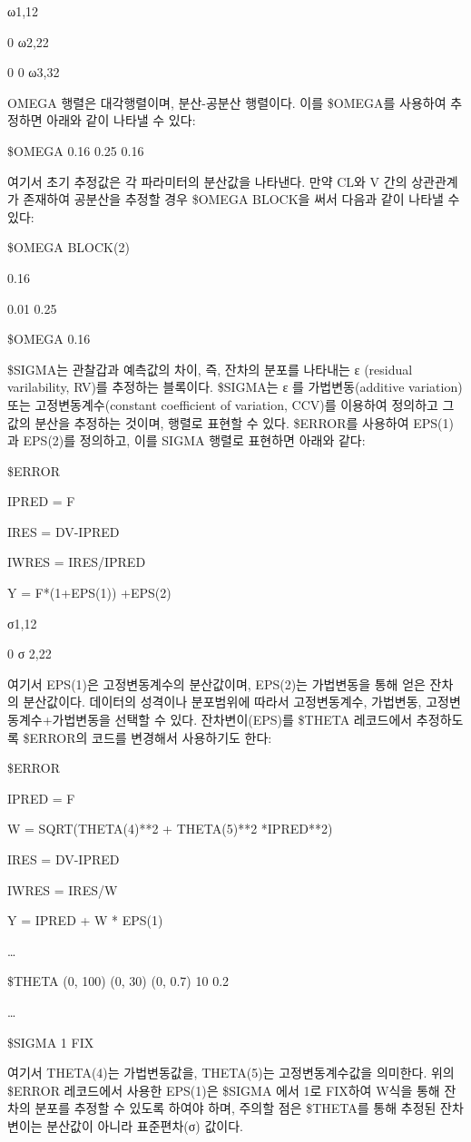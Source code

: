 \documentclass[
  10pt,
]{krantz}
\begin{document}
ω1,12

0 ω2,22

0 0 ω3,32

OMEGA 행렬은 대각행렬이며, 분산-공분산 행렬이다. 이를 \$OMEGA를 사용하여 추정하면 아래와 같이 나타낼 수 있다:

\$OMEGA 0.16 0.25 0.16

여기서 초기 추정값은 각 파라미터의 분산값을 나타낸다. 만약 CL와 V 간의 상관관계가 존재하여 공분산을 추정할 경우 \$OMEGA
BLOCK을 써서 다음과 같이 나타낼 수 있다:

\$OMEGA BLOCK(2)

0.16

0.01 0.25

\$OMEGA 0.16

\$SIGMA는 관찰갑과 예측값의 차이, 즉, 잔차의 분포를 나타내는 ε (residual varilability, RV)를
추정하는 블록이다. \$SIGMA는 ε 를 가법변동(additive variation) 또는
고정변동계수(constant coefficient of variation, CCV)를 이용하여 정의하고 그
값의 분산을 추정하는 것이며, 행렬로 표현할 수 있다. \$ERROR를 사용하여 EPS(1)과 EPS(2)를 정의하고, 이를
SIGMA 행렬로 표현하면 아래와 같다:

\$ERROR

IPRED = F

IRES = DV-IPRED

IWRES = IRES/IPRED

Y = F*(1+EPS(1)) +EPS(2)

σ1,12

0 σ 2,22

여기서 EPS(1)은 고정변동계수의 분산값이며, EPS(2)는 가법변동을 통해 얻은 잔차의 분산값이다. 데이터의 성격이나
분포범위에 따라서 고정변동계수, 가법변동, 고정변동계수+가법변동을 선택할 수 있다. 잔차변이(EPS)를
\$THETA 레코드에서 추정하도록 \$ERROR의 코드를 변경해서 사용하기도 한다:

\$ERROR

IPRED = F

W = SQRT(THETA(4)**2 + THETA(5)**2 *IPRED**2)

IRES = DV-IPRED

IWRES = IRES/W

Y = IPRED + W * EPS(1)

\ldots{}

\$THETA (0, 100) (0, 30) (0, 0.7) 10 0.2

\ldots{}

\$SIGMA 1 FIX

여기서 THETA(4)는 가법변동값을, THETA(5)는 고정변동계수값을 의미한다. 위의 \$ERROR 레코드에서 사용한
EPS(1)은 \$SIGMA 에서 1로 FIX하여 W식을 통해 잔차의 분포를 추정할 수 있도록 하여야 하며, 주의할 점은
\$THETA를 통해 추정된 잔차변이는 분산값이 아니라 표준편차(σ) 값이다.
\end{document}
